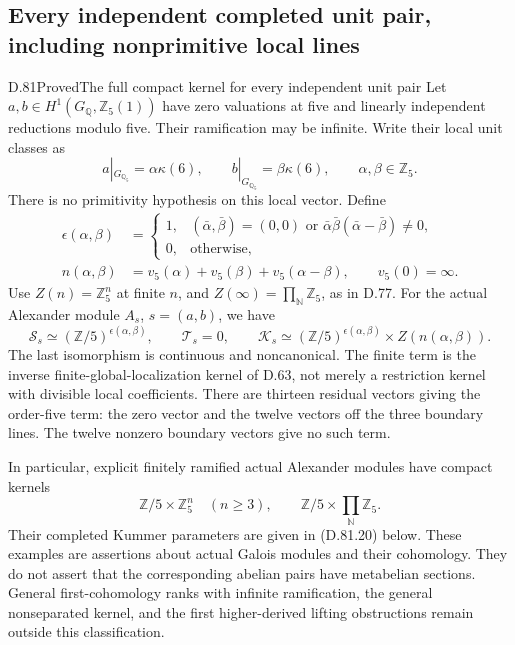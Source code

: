 \subsection{Every independent completed unit pair, including nonprimitive local lines}

\begin{statement}{D.81}{Proved}{The full compact kernel for every independent unit pair}
Let \(a,b\in H^1(G_{\mathbb Q},\mathbb Z_5(1))\) have zero
valuations at five and linearly independent reductions modulo five.
Their ramification may be infinite. Write their local unit classes as
\[
 a|_{G_{\mathbb Q_5}}=\alpha\kappa(6),\qquad
 b|_{G_{\mathbb Q_5}}=\beta\kappa(6),
 \qquad \alpha,\beta\in\mathbb Z_5.
                                                               \tag{D.81.1}
\]
There is no primitivity hypothesis on this local vector. Define
\[
 \begin{split}
 \epsilon(\alpha,\beta)&=
 \begin{cases}
  1,&(\bar\alpha,\bar\beta)=(0,0)
       \text{ or }\bar\alpha\bar\beta(\bar\alpha-\bar\beta)\ne0,\\
  0,&\text{otherwise},
 \end{cases}\\
 n(\alpha,\beta)&=
      v_5(\alpha)+v_5(\beta)+v_5(\alpha-\beta),
       \qquad v_5(0)=\infty.
 \end{split}                                                   \tag{D.81.2}
\]
Use \(Z(n)=\mathbb Z_5^n\) at finite \(n\), and
\(Z(\infty)=\prod_{\mathbb N}\mathbb Z_5\), as in D.77.
For the actual Alexander module \(A_s\), \(s=(a,b)\), we have
\[
 \mathcal S_s\simeq(\mathbb Z/5)^{\epsilon(\alpha,\beta)},
 \qquad \mathcal T_s=0,\qquad
 \mathcal K_s\simeq
       (\mathbb Z/5)^{\epsilon(\alpha,\beta)}
                         \times Z(n(\alpha,\beta)).
                                                               \tag{D.81.3}
\]
The last isomorphism is continuous and noncanonical. The finite term
is the inverse finite-global-localization kernel of D.63, not merely
a restriction kernel with divisible local coefficients.
There are thirteen residual vectors giving the order-five term:
the zero vector and the twelve vectors off the three boundary lines.
The twelve nonzero boundary vectors give no such term.

In particular, explicit finitely ramified actual Alexander modules
have compact kernels
\[
  \mathbb Z/5\times\mathbb Z_5^n\quad(n\ge3),
  \qquad
  \mathbb Z/5\times\prod_{\mathbb N}\mathbb Z_5.
                                                               \tag{D.81.4}
\]
Their completed Kummer parameters are given in (D.81.20) below.
These examples are assertions about actual Galois modules and their
cohomology. They do not assert that the corresponding abelian pairs
have metabelian sections. General first-cohomology ranks with
infinite ramification, the general nonseparated kernel, and the
first higher-derived lifting obstructions remain outside this
classification.
\end{statement}


